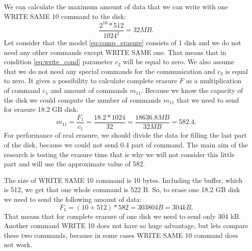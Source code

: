 We can calculate the maximum amount of data that we can write with one WRITE SAME 10 command to the disk:
\begin{equation}
	\frac{2^{16}*512}{1024^2} = 32 MB.
\end{equation}
Let consider that the model \ref{eq:comp_erasure} consists of 1 disk and we do not need any other commands except WRITE SAME one. That means that in condition \ref{eq:write_cond} parameter $c_2$ will be equal to zero. We also assume that we do not need any special commands for the communication and $c_3$ is equal to zero. It gives a possibility to calculate complete erasure $F$ as a multiplication of command $c_1$ and amount of commands $m_{11}$. Because we know the capacity of the disk we could compute the number of commands $m_{11}$ that we need to send for erasure 18.2 GB disk.
\begin{equation}
	m_{11} =\frac{F_1}{c_1} = \frac{18.2*1024}{32} = \frac{18636.8MB}{32MB} = 582.4.
\end{equation}
For performance of real erasure, we should divide the data for filling the last part of the disk, because we could not send 0.4 part of command. The main aim of the research is testing the erasure time that is why we will not consider this little part and will use the approximate value of 582.

The size of WRITE SAME 10 command is 10 bytes. Including the buffer, which is 512, we get that one whole command is 522 B.
So, to erase one 18.2 GB disk we need to send the following amount of data:
\begin{equation}
	F_1 = (10 + 512)*582 = 303804 B = 304 kB.
\end{equation}
That means that for complete erasure of one disk we need to send only 304 kB. Another command WRITE 10 does not have so huge advantage, but lets compare these two commands, because in some cases WRITE SAME 10 command does not work.


